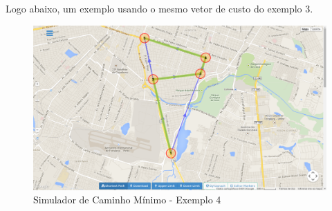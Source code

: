Logo abaixo, um exemplo usando o mesmo vetor de custo do exemplo 3.

\begin{figure}[htbp]
\centering
 \includegraphics[width=.70\textwidth]{figuras/validacao/ex4.png}
\caption{Simulador de Caminho Mínimo - Exemplo 4}
\label{fig:ex4}
\end{figure}
\FloatBarrier


